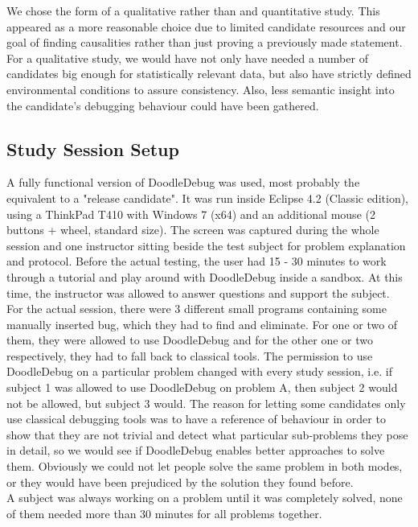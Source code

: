 \documentclass[english]{acm_proc_article-sp}
\newcommand\meta[1]{\nbc{META}{#1}{purple}}
\begin{document}
We chose the form of a qualitative rather than and quantitative study. This appeared as a more reasonable choice due to limited candidate resources and our goal of finding causalities rather than just proving a previously made statement. For a qualitative study, we would have not only have needed a number of candidates big enough for statistically relevant data, but also have strictly defined environmental conditions to assure consistency. Also, less semantic insight into the candidate's debugging behaviour could have been gathered\cite{psychology_research-methods}\meta{p. 13-15}.

\subsection{Study Session Setup}
A fully functional version of DoodleDebug was used, most probably the equivalent to a "release candidate". It was run inside Eclipse 4.2 (Classic edition), using a ThinkPad T410 with Windows 7 (x64) and an additional mouse (2 buttons + wheel, standard size). The screen was captured during the whole session and one instructor sitting beside the test subject for problem explanation and protocol. Before the actual testing, the user had 15 - 30 minutes to work through a tutorial and play around with DoodleDebug inside a sandbox. At this time, the instructor was allowed to answer questions and support the subject.\\
For the actual session, there were 3 different small programs containing some manually inserted bug, which they had to find and eliminate. For one or two of them, they were allowed to use DoodleDebug and for the other one or two respectively, they had to fall back to classical tools. The permission to use DoodleDebug on a particular problem changed with every study session, i.e. if subject 1 was allowed to use DoodleDebug on problem A, then subject 2 would not be allowed, but subject 3 would. The reason for letting some candidates only use classical debugging tools was to have a reference of behaviour in order to show that they are not trivial and detect what particular sub-problems they pose in detail, so we would see if DoodleDebug enables better approaches to solve them. Obviously we could not let people solve the same problem in both modes, or they would have been prejudiced by the solution they found before.\\
A subject was always working on a problem until it was completely solved, none of them needed more than 30 minutes for all problems together.
\end{document}
